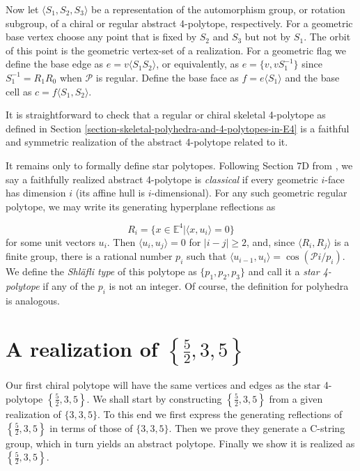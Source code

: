 \documentclass{amsart}
\begin{document}
Now let $\langle S_1,S_2,S_3\rangle$ be a representation of the automorphism
group, or rotation subgroup, of a chiral or regular abstract 4-polytope,
respectively. For a geometric base vertex choose any point that is fixed by
$S_2$ and $S_3$ but not by $S_1$. The orbit of this point is the geometric
vertex-set of a realization. For a geometric flag we define the base edge as
$e=v\langle S_1S_2\rangle$, or equivalently, as $e=\{v,vS_1^{-1}\}$ since
$S_1^{-1}=R_1R_0$ when $\mathcal{P}$ is regular. Define the base face as
$f=e\langle S_1\rangle$ and the base cell as $c=f\langle S_1,S_2\rangle$.
	
It is straightforward to check that a regular or chiral skeletal 4-polytope as
defined in Section \ref{section-skeletal-polyhedra-and-4-polytopes-in-E4} is a
faithful and symmetric realization of the abstract 4-polytope related to it.
	
It remains only to formally define star polytopes. Following Section 7D from
\cite{ARP}, we say a faithfully realized abstract 4-polytope is
\textit{classical} if every geometric $i$-face has dimension $i$ (its affine
hull is $i$-dimensional). For any such geometric regular polytope, we may write
its generating hyperplane reflections as

$$
R_i=\{x\in\mathbb{E}^4|\langle x,u_i\rangle=0\}
$$
for some unit vectors $u_i$. Then $\langle u_i,u_j\rangle=0$ for $|i-j|\geq2$,
and, since $\langle R_i,R_j\rangle$ is a finite group, there is a rational
number $p_i$ such that $\langle u_{i-1},u_i\rangle=\cos(\mathcal{P}i/p_i)$. We
define the \textit{Shläfli type} of this polytope as $\{p_1,p_2,p_3\}$ and call
it a \textit{star 4-polytope} if any of the $p_i$ is not an integer. Of course,
the definition for polyhedra is analogous.

\section{A realization of $\left\{\frac{5}{2},3,5\right\}$}
\label{section-a-realization-of-52-3-5}

Our first chiral polytope will have the same vertices and edges as the star
4-polytope $\left\{\frac{5}{2},3,5\right\}$. We shall start by constructing
$\left\{\frac{5}{2},3,5\right\}$ from a given realization of $\{3,3,5\}$. To
this end we first express the generating reflections of
$\left\{\frac{5}{2},3,5\right\}$ in terms of those of $\{3,3,5\}$. Then we prove
they generate a C-string group, which in turn yields an abstract polytope.
Finally we show it is realized as $\left\{\frac{5}{2},3,5\right\}$.
	
\end{document}
